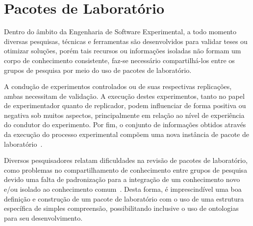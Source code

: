 
\section{Pacotes de Laboratório}
\label{sec:Pacote}
Dentro do âmbito da Engenharia de Software Experimental, a todo momento diversas pesquisas, técnicas e ferramentas são desenvolvidos para validar teses ou otimizar soluções, porém tais recursos ou informações isoladas não formam um corpo de
conhecimento consistente, faz-se necessário compartilhá-los entre os grupos de pesquisa por meio do uso de pacotes de laboratório.

A condução de experimentos controlados ou de suas respectivas replicações, ambas necessitam de validação. A execução destes experimentos, tanto no papel de experimentador quanto de replicador, podem influenciar de forma positiva ou negativa sob muitos aspectos, principalmente em relação ao nível de experiência do condutor do experimento. Por fim, o conjunto de informações obtidos através da execução do processo experimental compõem uma nova instância de pacote de laboratório~\cite{Garcia08}.

Diversos pesquisadores relatam dificuldades na revisão de pacotes de laboratório, como problemas no compartilhamento de conhecimento entre grupos de pesquisa devido uma falta de padronização para a integração de um conhecimento novo e/ou isolado ao conhecimento comum~\cite{Scatalon11}. Desta forma, é imprescindível uma boa definição e construção
de um pacote de laboratório com o uso de uma estrutura específica de simples compreensão, possibilitando inclusive o uso de ontologias para seu desenvolvimento.


